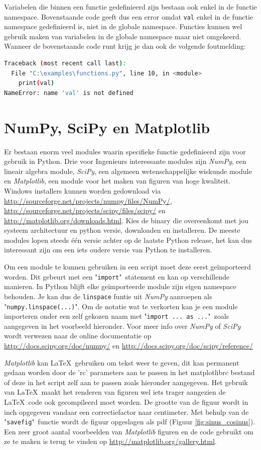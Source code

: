 \documentclass[11pt,twoside]{article}
\begin{document}
Variabelen die binnen een functie gedefinieerd zijn bestaan ook enkel in de functie namespace. Bovenstaande code geeft dus een error omdat \lstinline{val} enkel in de functie namespace gedefinieerd is, niet in de globale namespace. Functies kunnen wel gebruik maken van variabelen in de globale namespace maar niet omgekeerd. Wanneer de bovenstaande code runt krijg je dan ook de volgende foutmelding:
\begin{lstlisting}[language=bash]
Traceback (most recent call last):
  File "C:\examples\functions.py", line 10, in <module>
    print(val)
NameError: name 'val' is not defined
\end{lstlisting}

	\section{NumPy, SciPy en Matplotlib} 
Er bestaan enorm veel modules waarin specifieke functie gedefinieerd zijn voor gebruik in Python. Drie voor Ingenieurs interessante modules zijn \emph{NumPy}, een lineair algebra module, \emph{SciPy}, een algemeen wetenschappelijke wiskunde module en \emph{Matplotlib}, een module voor het maken van figuren van hoge kwaliteit. Windows installers kunnen worden gedownload via \url{http://sourceforge.net/projects/numpy/files/NumPy/}, \url{http://sourceforge.net/projects/scipy/files/scipy/} en \url{http://matplotlib.org/downloads.html}. Kies de binary die overeenkomt met jou systeem architectuur en python versie, downloaden en installeren. De meeste modules lopen steeds één versie achter op de laatste Python release, het kan dus interessant zijn om een iets oudere versie van Python te installeren.

Om een module te kunnen gebruiken in een script moet deze eerst geïmporteerd worden. Dit gebeurt met een "\lstinline{import}"\ statement en kan op verschillende manieren. In Python blijft elke geïmporteerde module zijn eigen namespace behouden. Je kan dus de \lstinline{linspace} funtie uit \emph{NumPy} aanroepen als "\lstinline{numpy.linspace(...)}". Om de notatie wat te verkorten kan je een module importeren onder een zelf gekozen naam met "\lstinline{import ... as ...}"\ zoals aangegeven in het voorbeeld hieronder. Voor meer info over \emph{NumPy} of \emph{SciPy} wordt verwezen naar de online documentatie op \url{http://docs.scipy.org/doc/numpy/} en \url{http://docs.scipy.org/doc/scipy/reference/}

\emph{Matplotlib} kan \LaTeX\ gebruiken om tekst weer te geven, dit kan permanent gedaan worden door de 'rc' parameters aan te passen in het \textsf{matplotlibrc} bestand of deze in het script zelf aan te passen zoals hieronder aangegeven. Het gebruik van \LaTeX\ maakt het renderen van figuren wel iets trager aangezien de \LaTeX\ code ook gecompileerd moet worden. De grootte van de figuur wordt in inch opgegeven vandaar een correctiefactor naar centimeter. Met behulp van de "\lstinline{savefig}"\ functie wordt de figuur opgeslagen als pdf (Figuur \ref{fig:sinus_cosinus}). Een zeer groot aantal voorbeelden van \emph{Matplotlib} figuren en de code gebruikt om ze te maken is terug te vinden op \url{http://matplotlib.org/gallery.html}.

\end{document}

